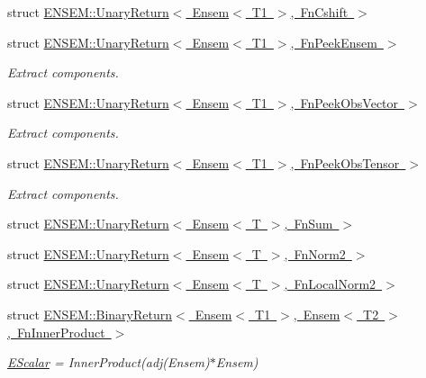 \begin{DoxyCompactItemize}
\item 
struct \mbox{\hyperlink{structENSEM_1_1UnaryReturn_3_01Ensem_3_01T1_01_4_00_01FnCshift_01_4}{E\+N\+S\+E\+M\+::\+Unary\+Return$<$ Ensem$<$ T1 $>$, Fn\+Cshift $>$}}
\item 
struct \mbox{\hyperlink{structENSEM_1_1UnaryReturn_3_01Ensem_3_01T1_01_4_00_01FnPeekEnsem_01_4}{E\+N\+S\+E\+M\+::\+Unary\+Return$<$ Ensem$<$ T1 $>$, Fn\+Peek\+Ensem $>$}}
\begin{DoxyCompactList}\small\item\em Extract components. \end{DoxyCompactList}\item 
struct \mbox{\hyperlink{structENSEM_1_1UnaryReturn_3_01Ensem_3_01T1_01_4_00_01FnPeekObsVector_01_4}{E\+N\+S\+E\+M\+::\+Unary\+Return$<$ Ensem$<$ T1 $>$, Fn\+Peek\+Obs\+Vector $>$}}
\begin{DoxyCompactList}\small\item\em Extract components. \end{DoxyCompactList}\item 
struct \mbox{\hyperlink{structENSEM_1_1UnaryReturn_3_01Ensem_3_01T1_01_4_00_01FnPeekObsTensor_01_4}{E\+N\+S\+E\+M\+::\+Unary\+Return$<$ Ensem$<$ T1 $>$, Fn\+Peek\+Obs\+Tensor $>$}}
\begin{DoxyCompactList}\small\item\em Extract components. \end{DoxyCompactList}\item 
struct \mbox{\hyperlink{structENSEM_1_1UnaryReturn_3_01Ensem_3_01T_01_4_00_01FnSum_01_4}{E\+N\+S\+E\+M\+::\+Unary\+Return$<$ Ensem$<$ T $>$, Fn\+Sum $>$}}
\item 
struct \mbox{\hyperlink{structENSEM_1_1UnaryReturn_3_01Ensem_3_01T_01_4_00_01FnNorm2_01_4}{E\+N\+S\+E\+M\+::\+Unary\+Return$<$ Ensem$<$ T $>$, Fn\+Norm2 $>$}}
\item 
struct \mbox{\hyperlink{structENSEM_1_1UnaryReturn_3_01Ensem_3_01T_01_4_00_01FnLocalNorm2_01_4}{E\+N\+S\+E\+M\+::\+Unary\+Return$<$ Ensem$<$ T $>$, Fn\+Local\+Norm2 $>$}}
\item 
struct \mbox{\hyperlink{structENSEM_1_1BinaryReturn_3_01Ensem_3_01T1_01_4_00_01Ensem_3_01T2_01_4_00_01FnInnerProduct_01_4}{E\+N\+S\+E\+M\+::\+Binary\+Return$<$ Ensem$<$ T1 $>$, Ensem$<$ T2 $>$, Fn\+Inner\+Product $>$}}
\begin{DoxyCompactList}\small\item\em \mbox{\hyperlink{classENSEM_1_1EScalar}{E\+Scalar}} = Inner\+Product(adj(\+Ensem)$\ast$\+Ensem) \end{DoxyCompactList}\item 

\end{DoxyCompactItemize}

